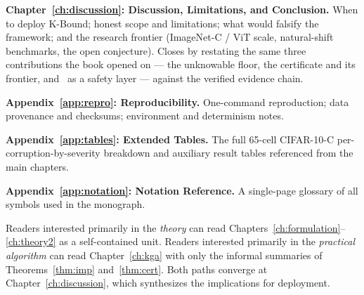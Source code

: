 \medskip
\noindent\textbf{Chapter~\ref{ch:discussion}: Discussion, Limitations, and Conclusion.}
When to deploy K-Bound; honest scope and limitations; what would falsify the
framework; and the research frontier (ImageNet-C / ViT scale, natural-shift
benchmarks, the open conjecture). Closes by restating the same three contributions
the book opened on --- the unknowable floor, the certificate and its frontier, and
\KGA\ as a safety layer --- against the verified evidence chain.

\medskip
\noindent\textbf{Appendix~\ref{app:repro}: Reproducibility.}
One-command reproduction; data provenance and checksums; environment and
determinism notes.

\medskip
\noindent\textbf{Appendix~\ref{app:tables}: Extended Tables.}
The full 65-cell CIFAR-10-C per-corruption-by-severity breakdown and
auxiliary result tables referenced from the main chapters.

\medskip
\noindent\textbf{Appendix~\ref{app:notation}: Notation Reference.}
A single-page glossary of all symbols used in the monograph.

\medskip\noindent
Readers interested primarily in the \emph{theory} can read
Chapters~\ref{ch:formulation}--\ref{ch:theory2} as a self-contained unit.
Readers interested primarily in the \emph{practical algorithm} can read
Chapter~\ref{ch:kga} with only the informal summaries of
Theorems~\ref{thm:imp} and~\ref{thm:cert}.
Both paths converge at Chapter~\ref{ch:discussion}, which synthesizes the
implications for deployment.
